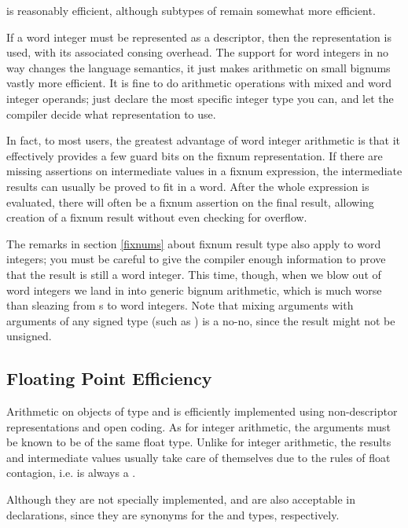 is reasonably efficient, although subtypes of  remain
somewhat more efficient.

If a word integer must be represented as a descriptor, then the
 representation is used, with its associated consing
overhead.  The support for word integers in no way changes the
language semantics, it just makes arithmetic on small bignums vastly
more efficient.  It is fine to do arithmetic operations with mixed
 and word integer operands; just declare the most
specific integer type you can, and let the compiler decide what
representation to use.

In fact, to most users, the greatest advantage of word integer
arithmetic is that it effectively provides a few guard bits on the
fixnum representation.  If there are missing assertions on
intermediate values in a fixnum expression, the intermediate results
can usually be proved to fit in a word.  After the whole expression is
evaluated, there will often be a fixnum assertion on the final result,
allowing creation of a fixnum result without even checking for
overflow.

The remarks in section \ref{fixnums} about fixnum result type also
apply to word integers; you must be careful to give the compiler
enough information to prove that the result is still a word integer.
This time, though, when we blow out of word integers we land in into
generic bignum arithmetic, which is much worse than sleazing from
s to word integers.  Note that mixing
 arguments with arguments of any signed
type (such as ) is a no-no, since the result might not be
unsigned.


\subsection{Floating Point Efficiency}
\label{float-efficiency}

Arithmetic on objects of type  and  is
efficiently implemented using non-descriptor representations and open coding.
As for integer arithmetic, the arguments must be known to be of the same float
type.  Unlike for integer arithmetic, the results and intermediate values
usually take care of themselves due to the rules of float contagion, i.e.
 is always a .

Although they are not specially implemented,  and
 are also acceptable in declarations, since they are
synonyms for the  and  types,
respectively.

